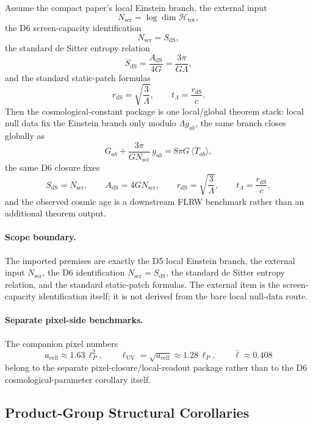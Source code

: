 \begin{theorem}
Assume the compact paper's local Einstein branch, the external input
\[
N_{\mathrm{scr}}=\log \dim \mathcal H_{\mathrm{tot}},
\]
the D6 screen-capacity identification
\[
N_{\mathrm{scr}}=S_{\mathrm{dS}},
\]
\noindent the standard de Sitter entropy relation
\[
S_{\mathrm{dS}}=\frac{A_{\mathrm{dS}}}{4G}=\frac{3\pi}{G\Lambda},
\]
and the standard static-patch formulas
\[
r_{\mathrm{dS}}=\sqrt{\frac{3}{\Lambda}},
\qquad
t_\Lambda=\frac{r_{\mathrm{dS}}}{c}.
\]
Then the cosmological-constant package is one local/global theorem stack: local null data fix the
Einstein branch only modulo \(\Lambda g_{ab}\), the same branch closes globally as
\[
G_{ab}+\frac{3\pi}{G N_{\mathrm{scr}}}\,g_{ab}=8\pi G\,\langle T_{ab}\rangle,
\]
the same D6 closure fixes
\[
S_{\mathrm{dS}}=N_{\mathrm{scr}},
\qquad
A_{\mathrm{dS}}=4G N_{\mathrm{scr}},
\qquad
r_{\mathrm{dS}}=\sqrt{\frac{3}{\Lambda}},
\qquad
t_\Lambda=\frac{r_{\mathrm{dS}}}{c},
\]
and the observed cosmic age is a downstream FLRW benchmark rather than an additional theorem
output.
\end{theorem}

\paragraph{Scope boundary.}
The imported premises are exactly the D5 local Einstein branch, the external input
\(N_{\mathrm{scr}}\), the D6 identification \(N_{\mathrm{scr}}=S_{\mathrm{dS}}\), the standard de
Sitter entropy relation, and the standard static-patch formulas. The external item is the
screen-capacity identification itself; it is not derived from the bare local null-data route.

\paragraph{Separate pixel-side benchmarks.}
The companion pixel numbers
\[
a_{\mathrm{cell}}\approx 1.63\,\ell_P^2,
\qquad
\ell_{\mathrm{UV}}=\sqrt{a_{\mathrm{cell}}}\approx 1.28\,\ell_P,
\qquad
\bar{\ell}\approx 0.408
\]
belong to the separate pixel-closure/local-readout package rather than to the D6 cosmological-parameter corollary itself.

\subsection{Product-Group Structural Corollaries}

